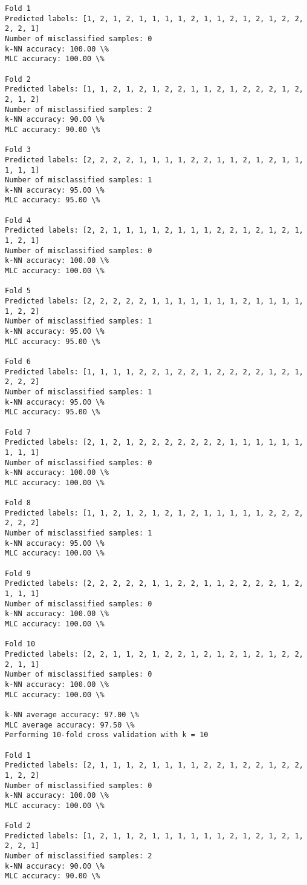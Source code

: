 \documentclass[11pt]{article}
\begin{document}
\begin{Verbatim}[commandchars=\\\{\}]
Fold 1
Predicted labels: [1, 2, 1, 2, 1, 1, 1, 1, 2, 1, 1, 2, 1, 2, 1, 2, 2, 2, 2, 1]
Number of misclassified samples: 0
k-NN accuracy: 100.00 \%
MLC accuracy: 100.00 \%

Fold 2
Predicted labels: [1, 1, 2, 1, 2, 1, 2, 2, 1, 1, 2, 1, 2, 2, 2, 1, 2, 2, 1, 2]
Number of misclassified samples: 2
k-NN accuracy: 90.00 \%
MLC accuracy: 90.00 \%

Fold 3
Predicted labels: [2, 2, 2, 2, 1, 1, 1, 1, 2, 2, 1, 1, 2, 1, 2, 1, 1, 1, 1, 1]
Number of misclassified samples: 1
k-NN accuracy: 95.00 \%
MLC accuracy: 95.00 \%

Fold 4
Predicted labels: [2, 2, 1, 1, 1, 1, 2, 1, 1, 1, 2, 2, 1, 2, 1, 2, 1, 1, 2, 1]
Number of misclassified samples: 0
k-NN accuracy: 100.00 \%
MLC accuracy: 100.00 \%

Fold 5
Predicted labels: [2, 2, 2, 2, 2, 1, 1, 1, 1, 1, 1, 1, 2, 1, 1, 1, 1, 1, 2, 2]
Number of misclassified samples: 1
k-NN accuracy: 95.00 \%
MLC accuracy: 95.00 \%

Fold 6
Predicted labels: [1, 1, 1, 1, 2, 2, 1, 2, 2, 1, 2, 2, 2, 2, 1, 2, 1, 2, 2, 2]
Number of misclassified samples: 1
k-NN accuracy: 95.00 \%
MLC accuracy: 95.00 \%

Fold 7
Predicted labels: [2, 1, 2, 1, 2, 2, 2, 2, 2, 2, 2, 1, 1, 1, 1, 1, 1, 1, 1, 1]
Number of misclassified samples: 0
k-NN accuracy: 100.00 \%
MLC accuracy: 100.00 \%

Fold 8
Predicted labels: [1, 1, 2, 1, 2, 1, 2, 1, 2, 1, 1, 1, 1, 1, 2, 2, 2, 2, 2, 2]
Number of misclassified samples: 1
k-NN accuracy: 95.00 \%
MLC accuracy: 100.00 \%

Fold 9
Predicted labels: [2, 2, 2, 2, 2, 1, 1, 2, 2, 1, 1, 2, 2, 2, 2, 1, 2, 1, 1, 1]
Number of misclassified samples: 0
k-NN accuracy: 100.00 \%
MLC accuracy: 100.00 \%

Fold 10
Predicted labels: [2, 2, 1, 1, 2, 1, 2, 2, 1, 2, 1, 2, 1, 2, 1, 2, 2, 2, 1, 1]
Number of misclassified samples: 0
k-NN accuracy: 100.00 \%
MLC accuracy: 100.00 \%

k-NN average accuracy: 97.00 \%
MLC average accuracy: 97.50 \%
Performing 10-fold cross validation with k = 10

Fold 1
Predicted labels: [2, 1, 1, 1, 2, 1, 1, 1, 1, 2, 2, 1, 2, 2, 1, 2, 2, 1, 2, 2]
Number of misclassified samples: 0
k-NN accuracy: 100.00 \%
MLC accuracy: 100.00 \%

Fold 2
Predicted labels: [1, 2, 1, 1, 2, 1, 1, 1, 1, 1, 1, 2, 1, 2, 1, 2, 1, 2, 2, 1]
Number of misclassified samples: 2
k-NN accuracy: 90.00 \%
MLC accuracy: 90.00 \%


\end{Verbatim}
\end{document}
